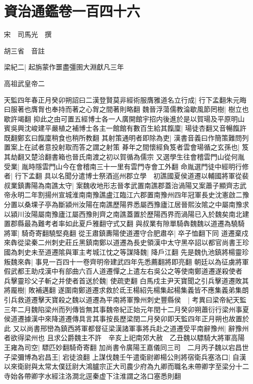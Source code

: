 \section{資治通鑑卷一百四十六}
宋　司馬光　撰

胡三省　音註

梁紀二|{
	起旃蒙作噩盡彊圉大淵獻凡三年}


高祖武皇帝二

天監四年春正月癸卯朔詔曰二漢登賢莫非經術服膺雅道名立行成|{
	行下孟翻朱元晦曰服著也膺胷也奉持而著之心胷之間著則略翻}
魏晉浮蕩儒教淪歇風節罔樹|{
	樹立也歇許竭翻}
抑此之由可置五經博士各一人廣開館宇招内後進於是以賀瑒及平原明山賓吳興沈峻建平嚴植之補博士各主一館館有數百生給其餼廩|{
	瑒徒杏翻又音暢餼許既翻鄭玄曰餼廩稍食也稍所教翻}
其射策通明者即除為吏|{
	漢書音義曰作簡策難問列置案上在試者意投射取而答之謂之射策}
朞年之間懷經負笈者雲會瑒循之玄孫也|{
	笈其劫翻又楚洽翻書箱也晉氏南渡之初以賀循為儒宗}
又選學生往會稽雲門山從何胤受業|{
	胤時隱雲門山今在會稽南三十一里有雲門寺會工外翻}
命胤選門徒中經明行修者|{
	行下孟翻}
具以名聞分遣博士祭酒巡州郡立學　初譙國夏侯道遷以輔國將軍從裴叔業鎮夀陽為南譙太守|{
	案魏收地形志晉孝武置南譙郡蓋治渦陽又案蕭子顯齊志武帝永明二年割揚州宣城淮南南豫譙盧江臨江六郡置南豫州四年冠軍長史沈憲啟二豫分置以桑堁子亭為斷潁州汝陽在南譙歷陽界悉屬西豫廬江居晉熙汝隂之中屬南豫求以潁川汝陽屬南豫廬江屬西豫則齊之南譙蓋置於歷陽西界而渦陽已入於魏矣南北建置郡縣最為難考者率如此夏戶雅翻守式又翻}
與叔業有隙單騎犇魏魏以道遷為驍騎將軍|{
	騎奇寄翻驍堅堯翻}
從王肅鎮夀陽使道遷守合肥肅卒|{
	卒子恤翻下同}
道遷棄戍來犇從梁秦二州刺史莊丘黑鎮南鄭以道遷為長史領漢中太守黑卒詔以都官尚書王珍國為刺史未至道遷隂與軍主考城江忱之等謀降魏|{
	降戶江翻}
先是魏仇池鎮將楊靈珍叛魏來犇|{
	事見一百四十一卷齊明帝建武四年先悉薦翻將即亮翻}
朝廷以為征虜將軍假武都王助戍漢中有部曲六百人道遷憚之上遣左右吳公之等使南鄭道遷遂殺使者兵擊靈珍父子斬之并使者首送於魏|{
	使疏吏翻}
白馬戍主尹天寶聞之引兵擊道遷敗其將龎樹|{
	敗補邁翻}
遂圍南鄭道遷求救於氐王楊紹先楊集起楊集義皆不應集義弟集朗引兵救道遷擊天寶殺之魏以道遷為平南將軍豫州刺史豐縣侯　|{
	考異曰梁帝紀天監三年二月魏陷梁州而列傳皆無其事魏帝紀正始元年閏十二月癸卯朔蕭衍行梁州事夏侯道遷據漢中來降道遷傳具言其事按長歷梁閏二月癸卯即天監四年正月朔也故置於此}
又以尚書邢巒為鎮西將軍都督征梁漢諸軍事將兵赴之道遷受平南辭豫州|{
	辭豫州者欲得梁州也}
且求公爵魏主不許　辛亥上祀南郊大赦　乙丑魏以驃騎大將軍高陽王雍為司空|{
	驃匹妙翻騎奇寄翻}
加尚書令廣陽王嘉儀同三司　二月丙子魏以宕昌世子梁彌博為宕昌王|{
	宕徒浪翻}
上謀伐魏壬午遣衛尉卿楊公則將宿衛兵塞洛口|{
	自漢以來衛尉與太常太僕廷尉大鴻臚宗正大司農少府為九卿而職名未帶卿字至梁分十二寺始各帶卿字水經注洛澗北逕秦虚下注淮謂之洛口塞悉則翻}
